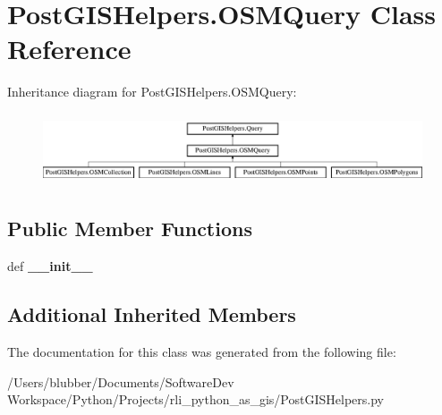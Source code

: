 \hypertarget{class_post_g_i_s_helpers_1_1_o_s_m_query}{}\section{Post\+G\+I\+S\+Helpers.\+O\+S\+M\+Query Class Reference}
\label{class_post_g_i_s_helpers_1_1_o_s_m_query}
Inheritance diagram for Post\+G\+I\+S\+Helpers.\+O\+S\+M\+Query\+:\begin{figure}[H]
\begin{center}
\leavevmode
\includegraphics[height=2.131979cm]{class_post_g_i_s_helpers_1_1_o_s_m_query}
\end{center}
\end{figure}
\subsection*{Public Member Functions}
\begin{DoxyCompactItemize}
\item 
\hypertarget{class_post_g_i_s_helpers_1_1_o_s_m_query_a3c279dbb90bb1cfad3321f36adbba0ec}{}def {\bfseries \+\_\+\+\_\+init\+\_\+\+\_\+}\label{class_post_g_i_s_helpers_1_1_o_s_m_query_a3c279dbb90bb1cfad3321f36adbba0ec}

\end{DoxyCompactItemize}
\subsection*{Additional Inherited Members}


The documentation for this class was generated from the following file\+:\begin{DoxyCompactItemize}
\item 
/\+Users/blubber/\+Documents/\+Software\+Dev Workspace/\+Python/\+Projects/rli\+\_\+python\+\_\+as\+\_\+gis/Post\+G\+I\+S\+Helpers.\+py\end{DoxyCompactItemize}
